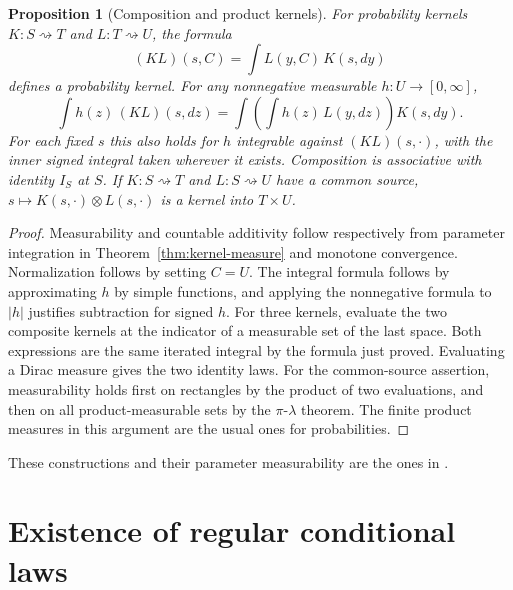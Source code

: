\documentclass[11pt,oneside,openany]{book}
\theoremstyle{plain}
\newtheorem{proposition}[theorem]{Proposition}
\theoremstyle{definition}
\theoremstyle{remark}
\begin{document}
\begin{proposition}[Composition and product kernels]\label{prop:kernel-composition}
For probability kernels \(K:S\rightsquigarrow T\) and \(L:T\rightsquigarrow U\), the formula
\[
 (KL)(s,C)=\int L(y,C)\,K(s,dy)
\]
defines a probability kernel. For any nonnegative measurable \(h:U\to[0,\infty]\),
\[
 \int h(z)\,(KL)(s,dz)
   =\int\left(\int h(z)\,L(y,dz)\right)K(s,dy).
\]
For each fixed \(s\) this also holds for \(h\) integrable against \((KL)(s,\cdot)\), with the inner signed integral taken wherever it exists. Composition is associative with identity \(I_S\) at \(S\). If \(K:S\rightsquigarrow T\) and \(L:S\rightsquigarrow U\) have a common source, \(s\mapsto K(s,\cdot)\otimes L(s,\cdot)\) is a kernel into \(T\times U\).
\end{proposition}
\begin{proof}
Measurability and countable additivity follow respectively from parameter integration in Theorem~\ref{thm:kernel-measure} and monotone convergence. Normalization follows by setting \(C=U\). The integral formula follows by approximating \(h\) by simple functions, and applying the nonnegative formula to \(\lvert h\rvert\) justifies subtraction for signed \(h\). For three kernels, evaluate the two composite kernels at the indicator of a measurable set of the last space. Both expressions are the same iterated integral by the formula just proved. Evaluating a Dirac measure gives the two identity laws. For the common-source assertion, measurability holds first on rectangles by the product of two evaluations, and then on all product-measurable sets by the \(\pi\)-\(\lambda\) theorem. The finite product measures in this argument are the usual ones for probabilities.
\end{proof}

These constructions and their parameter measurability are the ones in \cite[Lemmas 3.1--3.3, pp.~56--59]{Kallenberg}.

\section{Existence of regular conditional laws}\label{p04-03}
\end{document}
